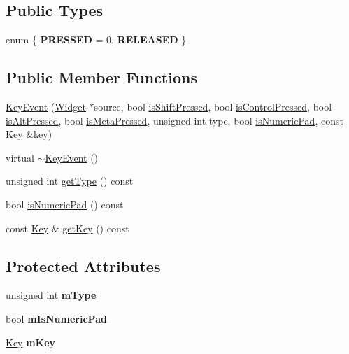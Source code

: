 \subsection*{Public Types}
\begin{DoxyCompactItemize}
\item 
enum \{ {\bfseries P\+R\+E\+S\+S\+ED} = 0, 
{\bfseries R\+E\+L\+E\+A\+S\+ED}
 \}
\end{DoxyCompactItemize}
\subsection*{Public Member Functions}
\begin{DoxyCompactItemize}
\item 
\hyperlink{classgcn_1_1KeyEvent_a2e395b2d9ec644e95c786b2e0e458229}{Key\+Event} (\hyperlink{classgcn_1_1Widget}{Widget} $\ast$source, bool \hyperlink{classgcn_1_1InputEvent_a15d5dbb808b46dfbf305fd7d9f595538}{is\+Shift\+Pressed}, bool \hyperlink{classgcn_1_1InputEvent_ae70fd17f3725f442353a9ef22a8c6260}{is\+Control\+Pressed}, bool \hyperlink{classgcn_1_1InputEvent_ae3cb422a3cc849aaa4241a93715ba85f}{is\+Alt\+Pressed}, bool \hyperlink{classgcn_1_1InputEvent_ae28913ad630a9728fff150ab14a4b909}{is\+Meta\+Pressed}, unsigned int type, bool \hyperlink{classgcn_1_1KeyEvent_a43ca39da368626ff40a58a2f38dd8bdb}{is\+Numeric\+Pad}, const \hyperlink{classgcn_1_1Key}{Key} \&key)
\item 
virtual \hyperlink{classgcn_1_1KeyEvent_affd36fd463ad2132ce07e39f250e0734}{$\sim$\+Key\+Event} ()
\item 
unsigned int \hyperlink{classgcn_1_1KeyEvent_a4ab6b411dbbd9f73c40da56bd1f00a35}{get\+Type} () const 
\item 
bool \hyperlink{classgcn_1_1KeyEvent_a43ca39da368626ff40a58a2f38dd8bdb}{is\+Numeric\+Pad} () const 
\item 
const \hyperlink{classgcn_1_1Key}{Key} \& \hyperlink{classgcn_1_1KeyEvent_a9494c8848b571eb99fd2b61e02c81722}{get\+Key} () const 
\end{DoxyCompactItemize}
\subsection*{Protected Attributes}
\begin{DoxyCompactItemize}
\item 
unsigned int {\bfseries m\+Type}\hypertarget{classgcn_1_1KeyEvent_a747062a5d9a99321643a4c6416674337}{}\label{classgcn_1_1KeyEvent_a747062a5d9a99321643a4c6416674337}

\item 
bool {\bfseries m\+Is\+Numeric\+Pad}\hypertarget{classgcn_1_1KeyEvent_a28d8e17a74c4a41cf7abbf3b0594dc55}{}\label{classgcn_1_1KeyEvent_a28d8e17a74c4a41cf7abbf3b0594dc55}

\item 
\hyperlink{classgcn_1_1Key}{Key} {\bfseries m\+Key}\hypertarget{classgcn_1_1KeyEvent_a89b4da2fdfacef40debacee1cbe7aeae}{}\label{classgcn_1_1KeyEvent_a89b4da2fdfacef40debacee1cbe7aeae}

\end{DoxyCompactItemize}


